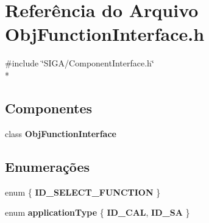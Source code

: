 \section{Referência do Arquivo Obj\+Function\+Interface.\+h}
\label{_obj_function_interface_8h}
{\ttfamily \#include \char`\"{}S\+I\+G\+A/\+Component\+Interface.\+h\char`\"{}}\\*
\subsection*{Componentes}
\begin{DoxyCompactItemize}
\item 
class {\bf Obj\+Function\+Interface}
\end{DoxyCompactItemize}
\subsection*{Enumerações}
\begin{DoxyCompactItemize}
\item 
enum \{ {\bf I\+D\+\_\+\+S\+E\+L\+E\+C\+T\+\_\+\+F\+U\+N\+C\+T\+I\+ON}
 \}
\item 
enum {\bf application\+Type} \{ {\bf I\+D\+\_\+\+C\+AL}, 
{\bf I\+D\+\_\+\+SA}
 \}
\end{DoxyCompactItemize}
